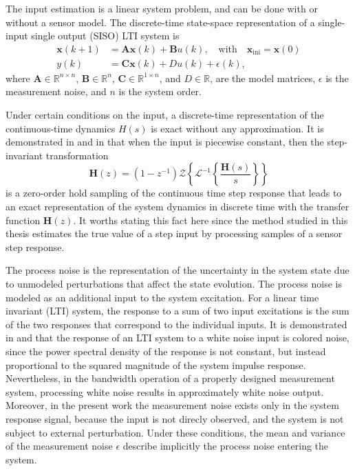 The input estimation is a linear system problem, and can be done with or without a sensor model.
The discrete-time state-space representation of a single-input single output (SISO) LTI system is
\begin{equation} \begin{aligned} \mathbf{x}(k+1) &= \mathbf{A} \mathbf{x}(k) + \mathbf{B} {u}(k), \quad \text{with} \quad \mathbf{x}_{\text{ini}} = \mathbf{x}(0) \\ 
{y}(k) &= \mathbf{C} \mathbf{x}(k) + {D} {u}(k) + {\epsilon}(k),  \label{eqn:dtsslti} \end{aligned} \end{equation}
where $\mathbf{A} \in \mathbb{R}^{n \times n}$, $\mathbf{B} \in \mathbb{R}^{n}$, $\mathbf{C} \in \mathbb{R}^{1 \times n}$, and ${D} \in \mathbb{R}$, are the model matrices, $\epsilon$ is the measurement noise, and $n$ is the system order. %

\color{blue}
Under certain conditions on the input, a discrete-time representation of the continuous-time dynamics $H(s)$ is exact without any approximation.
It is demonstrated in \citet{Ljung87Book} and in \citet{MiddletonGoodwinBook} that when the input is piecewise constant, then the step-invariant transformation
\begin{equation} \mathbf{H}(z) = \left( 1- z^{-1} \right) \mathcal{Z} \left\{ \mathcal{L}^{-1} \left\{ \dfrac{\mathbf{H}(s)}{s} \right\} \right\}   \end{equation}
is a zero-order hold sampling of the continuous time step response that leads to an exact representation of the system dynamics in discrete time with the transfer function $\mathbf{H}(z)$.
It worths stating this fact here since the method studied in this thesis estimates the true value of a step input by processing samples of a sensor step response. 
\color{black}

\color{blue} 
The process noise is the representation of the uncertainty in the system state due to unmodeled perturbations that affect the state evolution. 
The process noise is modeled as an additional input to the system excitation. 
For a linear time invariant (LTI) system, the response to a sum of two input excitations is the sum of the two responses that correspond to the individual inputs.
It is demonstrated in \citet{Gubner06} and \citet{Smith11} that the response of an LTI system to a white noise input is colored noise, since the power spectral density of the response is not constant, but instead proportional to the squared magnitude of the system impulse response.
Nevertheless, in the bandwidth operation of a properly designed measurement system, processing white noise results in approximately white noise output. 
Moreover, in the present work the measurement noise exists only in the system response signal, because the input is not direcly observed, and the system is not subject to external perturbation. 
Under these conditions, the mean and variance of the measurement noise $\epsilon$ describe implicitly the process noise entering the system. 
\color{black}

